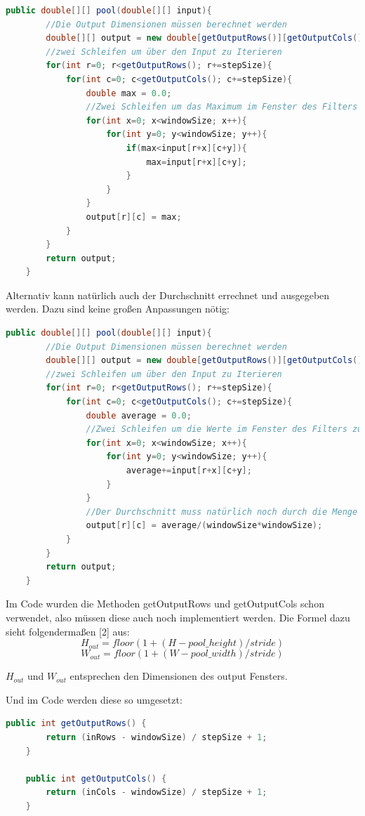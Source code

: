 \documentclass[12pt]{article}
\begin{document}
\begin{lstlisting}[language=Java]
 public double[][] pool(double[][] input){
 		//Die Output Dimensionen müssen berechnet werden
        double[][] output = new double[getOutputRows()][getOutputCols()];
        //zwei Schleifen um über den Input zu Iterieren
        for(int r=0; r<getOutputRows(); r+=stepSize){
            for(int c=0; c<getOutputCols(); c+=stepSize){
                double max = 0.0;
                //Zwei Schleifen um das Maximum im Fenster des Filters zu finden
                for(int x=0; x<windowSize; x++){
                    for(int y=0; y<windowSize; y++){
                        if(max<input[r+x][c+y]){
                            max=input[r+x][c+y];
                        }
                    }
                }
                output[r][c] = max;
            }
        }
        return output;
    }
\end{lstlisting}
Alternativ kann natürlich auch der Durchschnitt errechnet und ausgegeben werden. Dazu sind keine großen Anpassungen nötig:
\begin{lstlisting}[language=Java]
 public double[][] pool(double[][] input){
 		//Die Output Dimensionen müssen berechnet werden
        double[][] output = new double[getOutputRows()][getOutputCols()];
        //zwei Schleifen um über den Input zu Iterieren
        for(int r=0; r<getOutputRows(); r+=stepSize){
            for(int c=0; c<getOutputCols(); c+=stepSize){
                double average = 0.0;
                //Zwei Schleifen um die Werte im Fenster des Filters zu addieren
                for(int x=0; x<windowSize; x++){
                    for(int y=0; y<windowSize; y++){
                    	average+=input[r+x][c+y];
                    }
                }
                //Der Durchschnitt muss natürlich noch durch die Menge der im Filterfenster enthaltenen Pixel geteilt werden
                output[r][c] = average/(windowSize*windowSize);
            }
        }
        return output;
    }
\end{lstlisting}
Im Code wurden die Methoden getOutputRows und getOutputCols schon verwendet, also müssen diese auch noch implementiert werden. Die Formel dazu sieht folgendermaßen [2] aus:
$$H_{out} = floor(1 + (H - pool\_height)/stride)$$
$$W_{out} = floor(1 + (W - pool\_ width)/stride)$$

$H_{out}$ und $W_{out}$ entsprechen den Dimensionen des output Fensters. 

Und im Code werden diese so umgesetzt:

\begin{lstlisting}[language=Java]
    public int getOutputRows() {
        return (inRows - windowSize) / stepSize + 1;
    }

    public int getOutputCols() {
        return (inCols - windowSize) / stepSize + 1;
    }
\end{lstlisting}
\end{document}
